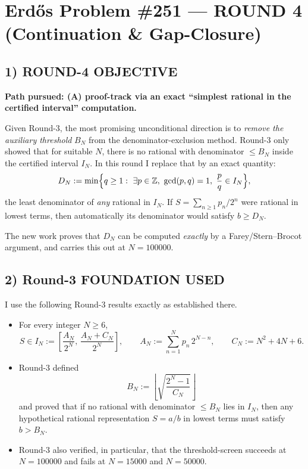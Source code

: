 \section*{Erd\H{o}s Problem \#251 --- ROUND 4 (Continuation \& Gap-Closure)}

\subsection*{1) ROUND-4 OBJECTIVE}

\textbf{Path pursued: (A) proof-track via an exact ``simplest rational in the certified interval'' computation.}

Given Round-3, the most promising unconditional direction is to \emph{remove the auxiliary threshold} $B_N$ from the denominator-exclusion method. Round-3 only showed that for suitable $N$, there is no rational with denominator $\le B_N$ inside the certified interval $I_N$. In this round I replace that by an exact quantity:
\[
D_N:=\min\Bigl\{q\ge 1:\ \exists p\in\mathbb Z,\ \gcd(p,q)=1,\ \frac pq\in I_N\Bigr\},
\]
the least denominator of \emph{any} rational in $I_N$.
If $S=\sum_{n\ge1}p_n/2^n$ were rational in lowest terms, then automatically its denominator would satisfy $b\ge D_N$.

The new work proves that $D_N$ can be computed \emph{exactly} by a Farey/Stern--Brocot argument, and carries this out at $N=100000$.

\subsection*{2) Round-3 FOUNDATION USED}

I use the following Round-3 results exactly as established there.

\begin{itemize}
\item For every integer $N\ge 6$,
\[
S\in I_N:=\left[\frac{A_N}{2^N},\,\frac{A_N+C_N}{2^N}\right],
\qquad
A_N:=\sum_{n=1}^N p_n\,2^{N-n},
\qquad
C_N:=N^2+4N+6.
\]
\item Round-3 defined
\[
B_N:=\left\lfloor \sqrt{\frac{2^N-1}{C_N}}\right\rfloor
\]
and proved that if no rational with denominator $\le B_N$ lies in $I_N$, then any hypothetical rational representation $S=a/b$ in lowest terms must satisfy $b>B_N$.
\item Round-3 also verified, in particular, that the threshold-screen succeeds at $N=100000$ and fails at $N=15000$ and $N=50000$.
\end{itemize}

